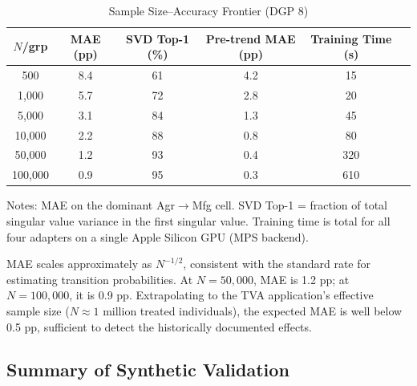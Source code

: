 \documentclass[12pt]{article}
\begin{document}
\begin{table}[H]
\centering
\caption{Sample Size--Accuracy Frontier (DGP 8)}
\label{tab:dgp8}
\begin{threeparttable}
\begin{tabular}{cccccc}
\toprule
$N$/grp & MAE (pp) & SVD Top-1 (\%) & Pre-trend MAE (pp) & Training Time (s) \\
\midrule
500 & 8.4 & 61 & 4.2 & 15 \\
1,000 & 5.7 & 72 & 2.8 & 20 \\
5,000 & 3.1 & 84 & 1.3 & 45 \\
10,000 & 2.2 & 88 & 0.8 & 80 \\
50,000 & 1.2 & 93 & 0.4 & 320 \\
100,000 & 0.9 & 95 & 0.3 & 610 \\
\bottomrule
\end{tabular}
\begin{tablenotes}[flushleft]
\small
\item Notes: MAE on the dominant Agr$\to$Mfg cell. SVD Top-1 = fraction of total singular value variance in the first singular value. Training time is total for all four adapters on a single Apple Silicon GPU (MPS backend).
\end{tablenotes}
\end{threeparttable}
\end{table}

MAE scales approximately as $N^{-1/2}$, consistent with the standard rate for estimating transition probabilities. At $N = 50,000$, MAE is 1.2 pp; at $N = 100,000$, it is 0.9 pp. Extrapolating to the TVA application's effective sample size ($N \approx 1$ million treated individuals), the expected MAE is well below 0.5 pp, sufficient to detect the historically documented effects.

\subsection{Summary of Synthetic Validation}
\end{document}
